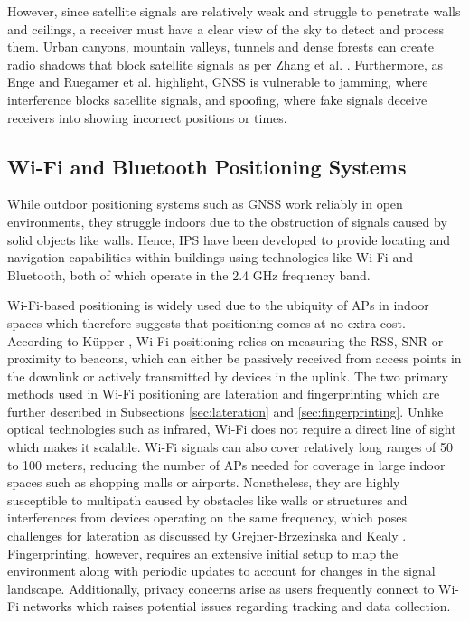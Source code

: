 However, since satellite signals are relatively weak and struggle to penetrate walls and ceilings, a receiver must have a clear view of the sky to detect and process them.
Urban canyons, mountain valleys, tunnels and dense forests can create radio shadows that block satellite signals as per Zhang et al. \cite{zhang2021gnss}. 
Furthermore, as Enge \cite{enge1994global} and Ruegamer et al. \cite{ruegamer2015jamming} highlight, \acs{GNSS} is vulnerable to jamming, where interference blocks satellite signals, and spoofing, where fake signals deceive receivers into showing incorrect positions or times.

\subsection{Wi-Fi and Bluetooth Positioning Systems}
While outdoor positioning systems such as \acs{GNSS} work reliably in open environments, they struggle indoors due to the obstruction of signals caused by solid objects like walls.
Hence, \ac{IPS} have been developed to provide locating and navigation capabilities within buildings using technologies like \acs{Wi-Fi} and Bluetooth, both of which operate in the 2.4 GHz frequency band.

\acs{Wi-Fi}-based positioning is widely used due to the ubiquity of \ac{APs} in indoor spaces which therefore suggests that positioning comes at no extra cost.
According to K\"upper \cite{kupper2005location}, \acs{Wi-Fi} positioning relies on measuring the \acs{RSS}, \ac{SNR} or proximity to beacons, which can either be passively received from access points in the downlink or actively transmitted by devices in the uplink.
The two primary methods used in \acs{Wi-Fi} positioning are lateration and fingerprinting which are further described in Subsections \ref{sec:lateration} and \ref{sec:fingerprinting}.
Unlike optical technologies such as infrared, \acs{Wi-Fi} does not require a direct line of sight which makes it scalable.
\acs{Wi-Fi} signals can also cover relatively long ranges of 50 to 100 meters, reducing the number of \acs{APs} needed for coverage in large indoor spaces such as shopping malls or airports. 
Nonetheless, they are highly susceptible to multipath caused by obstacles like walls or structures and interferences from devices operating on the same frequency, which poses challenges for lateration as discussed by Grejner-Brzezinska and Kealy \cite{grejner2004positioning}.
Fingerprinting, however, requires an extensive initial setup to map the environment along with periodic updates to account for changes in the signal landscape.
Additionally, privacy concerns arise as users frequently connect to \acs{Wi-Fi} networks which raises potential issues regarding tracking and data collection.


